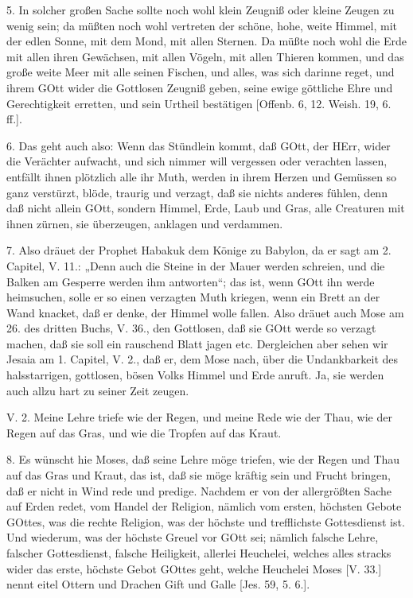 5. In solcher großen Sache sollte noch wohl klein Zeugniß oder kleine Zeugen zu wenig sein; da müßten noch wohl vertreten der schöne, hohe, weite Himmel, mit der edlen Sonne, mit dem Mond, mit allen Sternen. Da müßte noch wohl die Erde mit allen ihren Gewächsen, mit allen Vögeln, mit allen Thieren kommen, und das große weite Meer mit alle seinen Fischen, und alles, was sich darinne reget, und ihrem GOtt wider die Gottlosen Zeugniß geben, seine ewige göttliche Ehre und Gerechtigkeit erretten, und sein Urtheil bestätigen [Offenb. 6, 12. Weish. 19, 6. ff.].

6. Das geht auch also: Wenn das Stündlein kommt, daß GOtt, der HErr, wider die Verächter aufwacht, und sich nimmer will vergessen oder verachten lassen, entfällt ihnen plötzlich alle ihr Muth, werden in ihrem Herzen und Gemüssen
so ganz verstürzt, blöde, traurig und verzagt, daß sie nichts anderes fühlen, denn daß nicht allein GOtt, sondern Himmel, Erde, Laub und Gras, alle Creaturen mit ihnen zürnen, sie überzeugen, anklagen und verdammen.

7. Also dräuet der Prophet Habakuk dem Könige zu Babylon, da er sagt am 2. Capitel, V. 11.: „Denn auch die Steine in der Mauer werden schreien, und die Balken am Gesperre werden ihm antworten“; das ist, wenn GOtt ihn werde heimsuchen, solle er so einen verzagten Muth kriegen, wenn ein Brett an der Wand knacket, daß er denke, der Himmel wolle fallen. Also dräuet auch Mose am 26. des dritten Buchs, V. 36., den Gottlosen, daß sie GOtt werde so verzagt machen, daß sie soll ein rauschend Blatt jagen etc. Dergleichen aber sehen wir Jesaia am 1. Capitel, V. 2., daß er, dem Mose nach, über die Undankbarkeit des halsstarrigen, gottlosen, bösen Volks Himmel und Erde anruft. Ja, sie werden auch allzu hart zu seiner Zeit zeugen.

\begin{schriftzitat}
V. 2. Meine Lehre triefe wie der Regen, und meine Rede wie der Thau, wie der Regen auf das Gras, und wie die Tropfen auf das Kraut.
\end{schriftzitat}

8. Es wünscht hie Moses, daß seine Lehre möge triefen, wie der Regen und Thau auf das Gras und Kraut, das ist, daß sie möge kräftig sein und Frucht bringen, daß er nicht in Wind rede und predige. Nachdem er von der allergrößten Sache auf Erden redet, vom Handel der Religion, nämlich vom ersten, höchsten Gebote GOttes, was die rechte Religion, was der höchste und trefflichste Gottesdienst ist. Und wiederum, was der höchste Greuel vor GOtt sei; nämlich falsche Lehre, falscher Gottesdienst, falsche Heiligkeit, allerlei Heuchelei, welches alles stracks wider das erste, höchste Gebot GOttes geht, welche Heuchelei Moses [V. 33.] nennt eitel Ottern und Drachen Gift und Galle [Jes. 59, 5. 6.].

